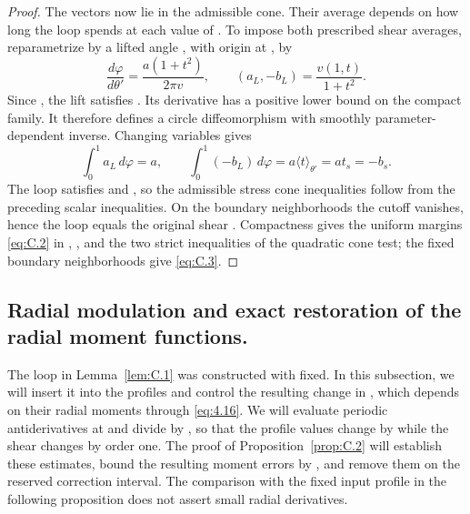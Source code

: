 \begin{proof}
The vectors now lie in the admissible cone. Their average depends on how long the loop
spends at each value of . To impose both prescribed shear averages, reparametrize
 by a
lifted angle , with origin at , by
\[
 \frac{d\varphi}{d\theta'}=\frac{a(1+t^2)}{2\pi v},
 \qquad (a_L,-b_L)=\frac{v(1,t)}{1+t^2}.
\]
Since , the lift satisfies
. Its derivative has a
positive lower bound on the compact family. It therefore defines a circle diffeomorphism
with smoothly parameter-dependent inverse. Changing variables gives
\[
 \int_0^1a_L\,d\varphi=a,
 \qquad
 \int_0^1(-b_L)\,d\varphi=a\langle t\rangle_{\theta'}=at_s=-b_s.
\]
The loop satisfies  and , so the admissible stress cone inequalities
follow from the preceding scalar inequalities. On the boundary neighborhoods the cutoff
vanishes, hence the loop equals the original shear . Compactness gives the uniform
margins \eqref{eq:C.2} in , , and the two strict inequalities of the quadratic cone test; the fixed
boundary neighborhoods give \eqref{eq:C.3}.
\end{proof}

%
\subsection{Radial modulation and exact restoration of the radial moment functions.}\label{sec:C.2}
The loop
in Lemma~\ref{lem:C.1} was constructed with  fixed. In this subsection, we will insert it into the
profiles  and control the resulting change in , which depends on their radial moments
through \eqref{eq:4.16}. We will evaluate periodic antiderivatives at  and divide by , so that
the profile values change by  while the shear changes by order one. The proof of
Proposition~\ref{prop:C.2} will establish these estimates, bound the resulting moment errors by
,
and remove them on the reserved correction interval. The comparison with the fixed input
profile  in the following proposition does not assert small radial derivatives.

